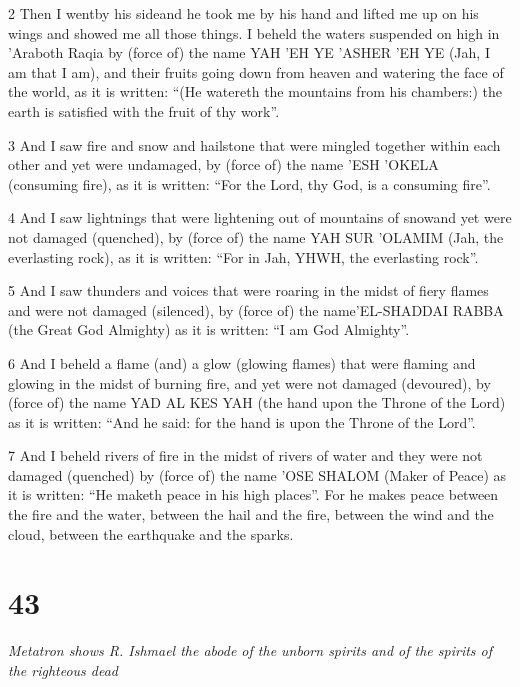 \par 2 Then I wentby his sideand he took me by his hand and lifted me up on his wings and showed me all those things. I beheld the waters suspended on high in 'Araboth Raqia by (force of) the name YAH 'EH YE 'ASHER 'EH YE (Jah, I am that I am), and their fruits going down from heaven and watering the face of the world, as it is written: “(He watereth the mountains from his chambers:) the earth is satisfied with the fruit of thy work”. 

\par 3 And I saw fire and snow and hailstone that were mingled together within each other and yet were undamaged, by (force of) the name 'ESH 'OKELA (consuming fire), as it is written: “For the Lord, thy God, is a consuming fire”. 

\par 4 And I saw lightnings that were lightening out of mountains of snowand yet were not damaged (quenched), by (force of) the name YAH SUR 'OLAMIM (Jah, the everlasting rock), as it is written: “For in Jah, YHWH, the everlasting rock”. 

\par 5 And I saw thunders and voices that were roaring in the midst of fiery flames and were not damaged (silenced), by (force of) the name'EL-SHADDAI RABBA (the Great God Almighty) as it is written: “I am God Almighty”.

\par 6 And I beheld a flame (and) a glow (glowing flames) that were flaming and glowing in the midst of burning fire, and yet were not damaged (devoured), by (force of) the name YAD AL KES YAH (the hand upon the Throne of the Lord) as it is written: “And he said: for the hand is upon the Throne of the Lord”. 

\par 7 And I beheld rivers of fire in the midst of rivers of water and they were not damaged (quenched) by (force of) the name 'OSE SHALOM (Maker of Peace) as it is written: “He maketh peace in his high places”. For he makes peace between the fire and the water, between the hail and the fire, between the wind and the cloud, between the earthquake and the sparks. 

\chapter{43}

\par \textit{Metatron shows R. Ishmael the abode of the unborn spirits and of the spirits of the righteous dead}


